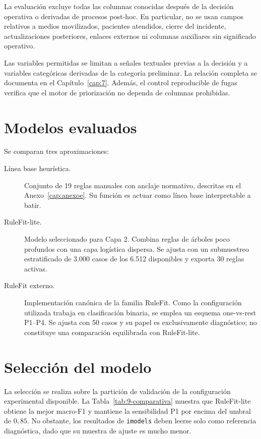 La evaluación excluye todas las columnas conocidas después de la decisión operativa o
derivadas de procesos post-hoc. En particular, no se usan campos relativos a medios movilizados, pacientes atendidos, cierre del incidente, actualizaciones posteriores, enlaces externos ni columnas auxiliares sin significado operativo.

Las variables permitidas se limitan a señales textuales previas a la decisión y a
variables categóricas derivadas de la categoría preliminar. La relación completa
se documenta en el Capítulo~\ref{cap:7}. Además, el control reproducible de fugas verifica que el motor de priorización no dependa de columnas prohibidas.

\section{Modelos evaluados}

Se comparan tres aproximaciones:

\begin{description}
    \item[Línea base heurística.] Conjunto de 19 reglas manuales con anclaje normativo,
    descritas en el Anexo~\ref{cap:anexoe}. Su función es actuar como línea base
    interpretable a batir.
    \item[RuleFit-lite.] Modelo seleccionado para Capa 2. Combina reglas de
    árboles poco profundos con una capa logística dispersa. Se ajusta con un submuestreo
    estratificado de 3.000 casos de los 6.512 disponibles y exporta 30 reglas activas.
    \item[RuleFit externo.] Implementación canónica de la familia RuleFit. Como la configuración utilizada trabaja en clasificación binaria,
    se emplea un esquema one-vs-rest P1--P4. Se ajusta con 50 casos y su papel es exclusivamente diagnóstico; no constituye una comparación equilibrada con RuleFit-lite.
\end{description}

\section{Selección del modelo}

La selección se realiza sobre la partición de validación de la configuración
experimental disponible. La Tabla~\ref{tab:9-comparativa} muestra que RuleFit-lite obtiene la
mejor macro-F1 y mantiene la sensibilidad P1 por encima del umbral de \(0{,}85\). No obstante,
los resultados de \texttt{imodels} deben leerse solo como referencia diagnóstica, dado que su
muestra de ajuste es mucho menor.

